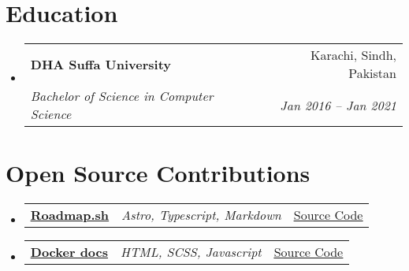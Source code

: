 \documentclass[a4paper,11pt]{article}
\makeatletter
\newcommand{\resumeItem}[1]{
  \item\small{#1}
}
\newcommand{\resumeItemListStart}{\begin{itemize}[rightmargin=0.11in]}
\newcommand{\resumeItemListEnd}{\end{itemize}}
\newcommand{\resumeTrioHeading}[3]{
  \item\small{
    \begin{tabular*}{0.96\textwidth}[t]{
      l@{\extracolsep{\fill}}c@{\extracolsep{\fill}}r
    }
      \textbf{#1} & \textit{#2} & #3
    \end{tabular*}
  }
}
\newcommand{\resumeQuadHeading}[4]{
  \item
  \begin{tabular*}{0.96\textwidth}[t]{l@{\extracolsep{\fill}}r}
    \textbf{#1} & #2 \\
    \textit{\small#3} & \textit{\small #4} \\
  \end{tabular*}
}
\newcommand{\resumeHeadingListStart}{
  \begin{itemize}[leftmargin=0.15in, label={}]
}
\newcommand{\resumeHeadingListEnd}{\end{itemize}}
\makeatother
\begin{document}

\section{Education}
  \resumeHeadingListStart{}
    \resumeQuadHeading{DHA Suffa University}{Karachi, Sindh, Pakistan}
    {Bachelor of Science in Computer Science}{Jan 2016 -- Jan 2021}
  \resumeHeadingListEnd{}



\section{Open Source Contributions}
  \resumeHeadingListStart{}
    \resumeTrioHeading{\href{https://roadmap.sh}{\uline{Roadmap.sh}}}{Astro, Typescript, Markdown}{\href{https://github.com/kamranahmedse/developer-roadmap}{\uline{Source Code}}}

      \resumeTrioHeading{\href{https://docs.docker.com/}{\uline{Docker docs}}}{HTML, SCSS, Javascript}{\href{https://github.com/docker/docs}{\uline{Source Code}}}
  \resumeHeadingListEnd{}



\end{document}
